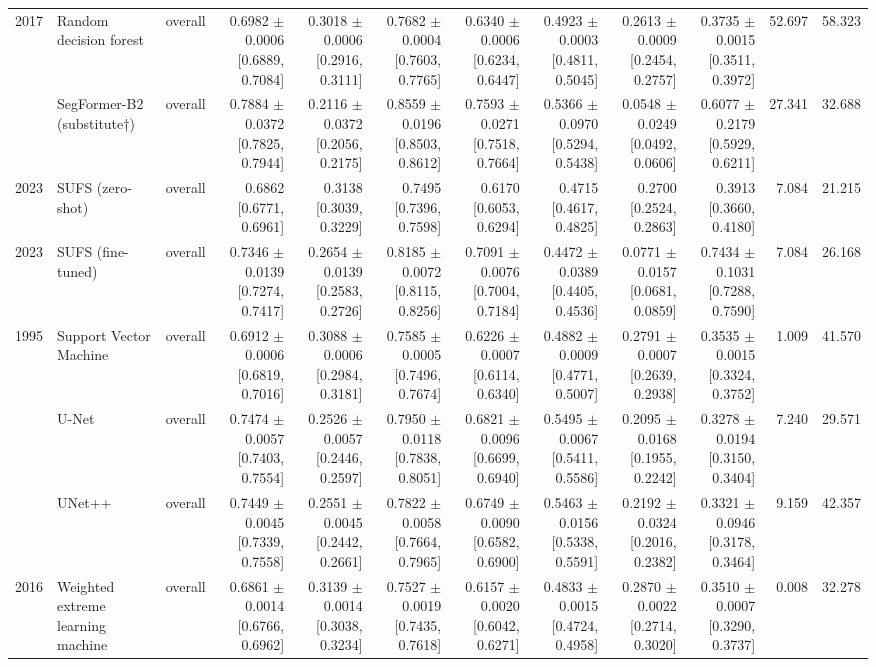 \begin{table}[t]
\begin{tabular}{lllrrrrrrrrr}
2017 & Random decision forest & overall & 0.6982 $\pm$ 0.0006 [0.6889, 0.7084] & 0.3018 $\pm$ 0.0006 [0.2916, 0.3111] & 0.7682 $\pm$ 0.0004 [0.7603, 0.7765] & 0.6340 $\pm$ 0.0006 [0.6234, 0.6447] & 0.4923 $\pm$ 0.0003 [0.4811, 0.5045] & 0.2613 $\pm$ 0.0009 [0.2454, 0.2757] & 0.3735 $\pm$ 0.0015 [0.3511, 0.3972] & 52.697 & 58.323 \\
 & SegFormer-B2 (substitute†) & overall & 0.7884 $\pm$ 0.0372 [0.7825, 0.7944] & 0.2116 $\pm$ 0.0372 [0.2056, 0.2175] & 0.8559 $\pm$ 0.0196 [0.8503, 0.8612] & 0.7593 $\pm$ 0.0271 [0.7518, 0.7664] & 0.5366 $\pm$ 0.0970 [0.5294, 0.5438] & 0.0548 $\pm$ 0.0249 [0.0492, 0.0606] & 0.6077 $\pm$ 0.2179 [0.5929, 0.6211] & 27.341 & 32.688 \\
2023 & SUFS (zero-shot) & overall & 0.6862 [0.6771, 0.6961] & 0.3138 [0.3039, 0.3229] & 0.7495 [0.7396, 0.7598] & 0.6170 [0.6053, 0.6294] & 0.4715 [0.4617, 0.4825] & 0.2700 [0.2524, 0.2863] & 0.3913 [0.3660, 0.4180] & 7.084 & 21.215 \\
2023 & SUFS (fine-tuned) & overall & 0.7346 $\pm$ 0.0139 [0.7274, 0.7417] & 0.2654 $\pm$ 0.0139 [0.2583, 0.2726] & 0.8185 $\pm$ 0.0072 [0.8115, 0.8256] & 0.7091 $\pm$ 0.0076 [0.7004, 0.7184] & 0.4472 $\pm$ 0.0389 [0.4405, 0.4536] & 0.0771 $\pm$ 0.0157 [0.0681, 0.0859] & 0.7434 $\pm$ 0.1031 [0.7288, 0.7590] & 7.084 & 26.168 \\
1995 & Support Vector Machine & overall & 0.6912 $\pm$ 0.0006 [0.6819, 0.7016] & 0.3088 $\pm$ 0.0006 [0.2984, 0.3181] & 0.7585 $\pm$ 0.0005 [0.7496, 0.7674] & 0.6226 $\pm$ 0.0007 [0.6114, 0.6340] & 0.4882 $\pm$ 0.0009 [0.4771, 0.5007] & 0.2791 $\pm$ 0.0007 [0.2639, 0.2938] & 0.3535 $\pm$ 0.0015 [0.3324, 0.3752] & 1.009 & 41.570 \\
 & U-Net & overall & 0.7474 $\pm$ 0.0057 [0.7403, 0.7554] & 0.2526 $\pm$ 0.0057 [0.2446, 0.2597] & 0.7950 $\pm$ 0.0118 [0.7838, 0.8051] & 0.6821 $\pm$ 0.0096 [0.6699, 0.6940] & 0.5495 $\pm$ 0.0067 [0.5411, 0.5586] & 0.2095 $\pm$ 0.0168 [0.1955, 0.2242] & 0.3278 $\pm$ 0.0194 [0.3150, 0.3404] & 7.240 & 29.571 \\
 & UNet++ & overall & 0.7449 $\pm$ 0.0045 [0.7339, 0.7558] & 0.2551 $\pm$ 0.0045 [0.2442, 0.2661] & 0.7822 $\pm$ 0.0058 [0.7664, 0.7965] & 0.6749 $\pm$ 0.0090 [0.6582, 0.6900] & 0.5463 $\pm$ 0.0156 [0.5338, 0.5591] & 0.2192 $\pm$ 0.0324 [0.2016, 0.2382] & 0.3321 $\pm$ 0.0946 [0.3178, 0.3464] & 9.159 & 42.357 \\
2016 & Weighted extreme learning machine & overall & 0.6861 $\pm$ 0.0014 [0.6766, 0.6962] & 0.3139 $\pm$ 0.0014 [0.3038, 0.3234] & 0.7527 $\pm$ 0.0019 [0.7435, 0.7618] & 0.6157 $\pm$ 0.0020 [0.6042, 0.6271] & 0.4833 $\pm$ 0.0015 [0.4724, 0.4958] & 0.2870 $\pm$ 0.0022 [0.2714, 0.3020] & 0.3510 $\pm$ 0.0007 [0.3290, 0.3737] & 0.008 & 32.278 \\

\end{tabular}
\end{table}
